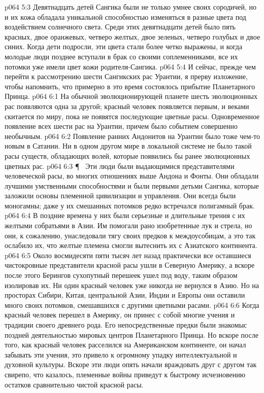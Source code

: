 \vs p064 5:3 Девятнадцать детей Сангика были не только умнее своих сородичей, но и их кожа обладала уникальной способностью изменяться в разные цвета под воздействием солнечного света. Среди этих девятнадцати детей было пять красных, двое оранжевых, четверо желтых, двое зеленых, четверо голубых и двое синих. Когда дети подросли, эти цвета стали более четко выражены, и когда молодые люди позднее вступали в брак со своими соплеменниками, все их потомки уже имели цвет кожи родителя\hyp{}Сангика.
\vs p064 5:4 И сейчас, прежде чем перейти к рассмотрению шести Сангикских рас Урантии, я прерву изложение, чтобы напомнить, что примерно в это время состоялось прибытие Планетарного Принца.
\vs p064 6:1 На обычной эволюционирующей планете шесть эволюционных рас появляются одна за другой; красный человек появляется первым, и веками скитается по миру, пока не появятся последующие цветные расы. Одновременное появление всех шести рас на Урантии, причем  было событием совершенно необычным.
\vs p064 6:2 Появление ранних Андонитов на Урантии было тоже чем\hyp{}то новым в Сатании. Ни в одном другом мире в локальной системе не было такой расы существ, обладающих волей, которые появились бы ранее эволюционных цветных рас.
\vs p064 6:3 \P\ \bibnobreakspace {} Эти люди были выдающимися представителями человеческой расы, во многих отношениях выше Андона и Фонты. Они обладали лучшими умственными способностями и были первыми детьми Сангика, которые заложили основы племенной цивилизации и управления. Они всегда были моногамны; даже у их смешанных потомков редко встречался полигамный брак.
\vs p064 6:4 В поздние времена у них были серьезные и длительные трения с их желтыми собратьями в Азии. Им помогали рано изобретенные лук и стрела, но они, к сожалению, унаследовали тягу своих предков к междоусобицам, а это так ослабило их, что желтые племена смогли вытеснить их с Азиатского континента.
\vs p064 6:5 Около восмидесяти пяти тысяч лет назад практически все оставшиеся чистокровные представители красной расы ушли в Северную Америку, а вскоре после этого Берингов сухопутный перешеек ушел под воду, таким образом изолировав их. Ни один красный человек уже никогда не вернулся в Азию. Но на просторах Сибири, Китая, центральной Азии, Индии и Европы они оставили много своих потомков, смешавшихся с другими цветными расами.
\vs p064 6:6 Когда красный человек перешел в Америку, он принес с собой многие учения и традиции своего древнего рода. Его непосредственные предки были знакомыс поздней деятельностью мировых центров Планетарного Принца. Но вскоре после того, как красный человек расселился на Американском континенте, он начал забывать эти учения, это привело к огромному упадку интеллектуальной и духовной культуры. Вскоре эти люди опять начали враждовать друг с другом так свирепо, что казалось, племенные войны приведут к быстрому исчезновению остатков сравнительно чистой красной расы.
